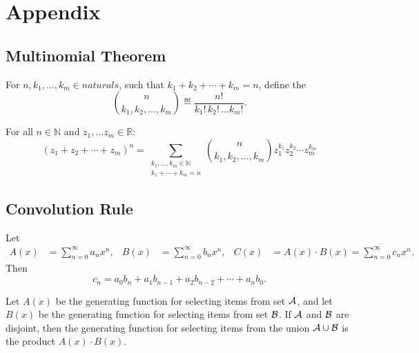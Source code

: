 \documentclass[handout]{mcs}
\begin{document}




\section{Appendix}

\subsection{Multinomial Theorem}

\begin{definition}
For $n,k_1,\dots,k_m \in naturals$, such that $k_1+k_2+\cdots+k_m = n$,
define the 
\[
\binom{n}{k_1, k_2, \dots, k_m} \eqdef \frac{n!}{k_1!\, k_2!\, \dots k_m!}.
\]
\end{definition}

\begin{theorem}\label{ml}
For all $n \in \mathbb{N}$ and $z_1, \dots z_m \in \mathbb{R}$:
\[
(z_1 + z_2 + \cdots + z_m)^n =
   \sum_{\substack{k_1, \dots, k_m \in \mathbb{N} \\
                   k_1 + \cdots + k_m = n}}
   \binom{n}{k_1, k_2, \dots, k_m} z_1^{k_1} z_2^{k_2} \cdots z_m^{k_m} 
\]
\end{theorem}


\subsection{Convolution Rule}

Let
\begin{align*}
A(x) & = \sum_{n=0}^{\infty} a_n x^n, &
B(x) & = \sum_{n=0}^{\infty} b_n x^n, &
C(x) & = A(x) \cdot B(x) = \sum_{n=0}^{\infty} c_n x^n.
\end{align*}
Then
\[
c_n = a_0 b_n + a_1 b_{n-1} + a_2 b_{n-2} + \cdots + a_n b_0.
\]

\begin{mathrule}
Let $A(x)$ be the generating function for selecting items from set
${\cal A}$, and let $B(x)$ be the generating function for selecting
items from set ${\cal B}$.  If ${\cal A}$ and ${\cal B}$ are disjoint,
then the generating function for selecting items from the union ${\cal
A} \cup {\cal B}$ is the product $A(x) \cdot B(x)$.
\end{mathrule}
\end{document}
